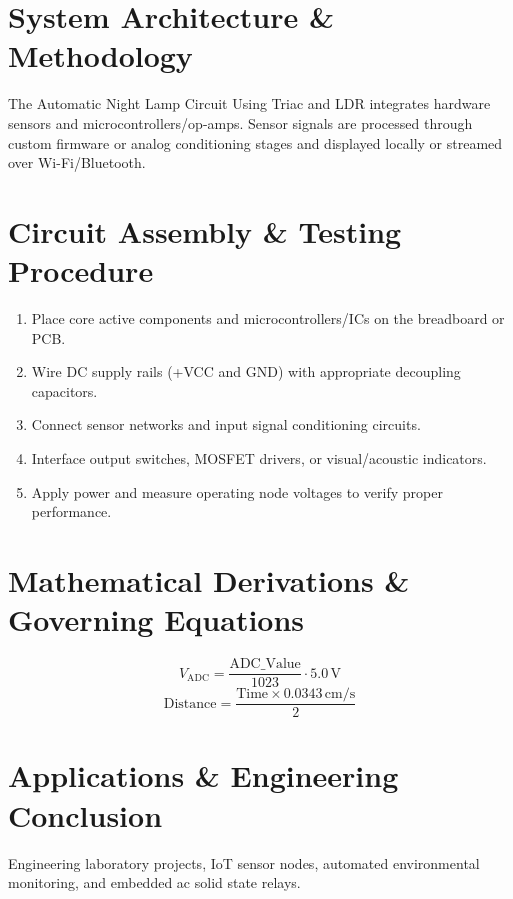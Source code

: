 \documentclass[11pt,a4paper]{article}
\begin{document}
\section{System Architecture \& Methodology}
The Automatic Night Lamp Circuit Using Triac and LDR integrates hardware sensors and microcontrollers/op-amps. Sensor signals are processed through custom firmware or analog conditioning stages and displayed locally or streamed over Wi-Fi/Bluetooth.

\section{Circuit Assembly \& Testing Procedure}
\begin{enumerate}
    \item Place core active components and microcontrollers/ICs on the breadboard or PCB.
    \item Wire DC supply rails (+VCC and GND) with appropriate decoupling capacitors.
    \item Connect sensor networks and input signal conditioning circuits.
    \item Interface output switches, MOSFET drivers, or visual/acoustic indicators.
    \item Apply power and measure operating node voltages to verify proper performance.
\end{enumerate}

\section{Mathematical Derivations \& Governing Equations}
\begin{equation}
V_{\text{ADC}} = \frac{\text{ADC\_Value}}{1023} \cdot 5.0\,\text{V}
\end{equation}
\begin{equation}
\text{Distance} = \frac{\text{Time} \times 0.0343\,\text{cm/s}}{2}
\end{equation}

\section{Applications \& Engineering Conclusion}
Engineering laboratory projects, IoT sensor nodes, automated environmental monitoring, and embedded ac solid state relays.
\end{document}
